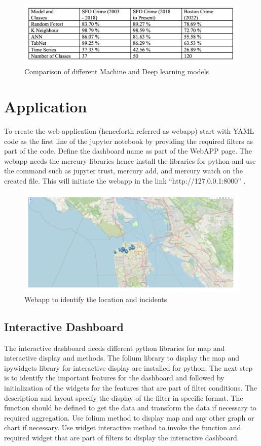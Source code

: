 \documentclass[conference,final,]{IEEEtran}
\begin{document}
\begin{figure}

{\centering \includegraphics[width=0.5\linewidth]{img/tab1} 

}

\caption{Comparison of different Machine and Deep learning models}\label{fig:unnamed-chunk-12}
\end{figure}

\section{Application}\label{application}

To create the web application (henceforth referred as webapp) start with
YAML code as the first line of the jupyter notebook by providing the
required filters as part of the code. Define the dashboard name as part
of the WebAPP page. The webapp needs the mercury libraries hence install
the libraries for python and use the command such as jupyter trust,
mercury add, and mercury watch on the created file. This will initiate
the webapp in the link ``http://127.0.0.1:8000'' .

\begin{figure}

{\centering \includegraphics[width=0.5\linewidth]{img/fig14a} 

}

\caption{Webapp to identify the location and incidents}\label{fig:unnamed-chunk-13}
\end{figure}

\subsection{Interactive Dashboard}\label{interactive-dashboard}

The interactive dashboard needs different python libraries for map and
interactive display and methods. The folium library to display the map
and ipywidgets library for interactive display are installed for python.
The next step is to identify the important features for the dashboard
and followed by initialization of the widgets for the features that are
part of filter conditions. The description and layout specify the
display of the filter in specific format. The function should be defined
to get the data and transform the data if necessary to required
aggregation. Use folium method to display map and any other graph or
chart if necessary. Use widget interactive method to invoke the function
and required widget that are part of filters to display the interactive
dashboard.
\end{document}
